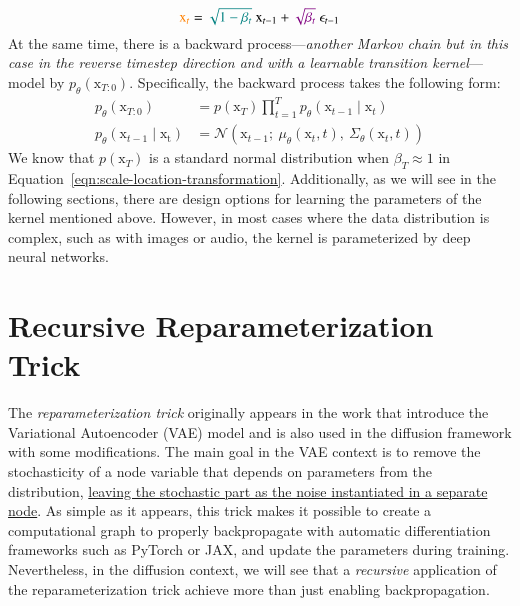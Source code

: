 \begin{equation}\label{eqn:scale-location-transformation}
    \textcolor{orange}{\mathrm{x}_{t}} = \textcolor{teal}{\sqrt{1-\beta_{t}}}~ \mathrm{x}_{t-1} + \textcolor{violet}{\sqrt{\beta_{t}}}~\mathrm{\epsilon}_{t-1}
\end{equation}
At the same time, there is a backward process---\textit{another Markov chain but in this case in the reverse timestep direction and with a learnable transition kernel}---model by $p_{\theta}(\mathrm{x}_{T:0})$. Specifically, 
the backward process takes the following form:
\begin{align}\label{eqn:backward-process}
    p_{\theta}(\mathrm{x}_{T:0}) &= p(\mathrm{x}_{T})\prod_{t=1}^{T}p_{\theta}(\mathrm{x}_{t-1}\mid\mathrm{x}_{t})
    \\
    p_{\theta}(\mathrm{x}_{t-1}\mid\mathrm{x_{t}}) &= \mathcal{N}(\mathrm{x}_{t-1};~\mu_{\theta}(\mathrm{x}_{t}, t),~\Sigma_{\theta}(\mathrm{x}_{t}, t))
\end{align}
We know that $p(\mathrm{x}_{T})$ is a standard normal distribution when $\beta_{T}\approx 1$ in Equation~\ref{eqn:scale-location-transformation}. Additionally, as we will see in the following sections, there are design options for learning the parameters of the kernel mentioned above. However, in most cases where the data distribution is complex, such as with images or audio, the kernel is parameterized by deep neural networks.\\

\section{Recursive Reparameterization Trick}\label{sec:reparameterization-trick}

The \textit{reparameterization trick} originally appears in the work that introduce the Variational Autoencoder (VAE) model \cite{kingma2013auto} and is also used in the diffusion framework with some modifications. The main goal in the VAE context is to remove the stochasticity of a node variable that depends on parameters from the distribution, \href{https://web.archive.org/web/20160418040123/http://dpkingma.com/wordpress/wp-content/uploads/2015/12/talk_nips_workshop_2015.pdf}{leaving the stochastic part as the noise instantiated in a separate node}. As simple as it appears, this trick makes it possible to create a computational graph to properly backpropagate with automatic differentiation frameworks such as PyTorch or JAX, and update the parameters during training. Nevertheless, in the diffusion context, we will
see that a \textit{recursive} application of the reparameterization trick achieve more than just enabling backpropagation. \\

